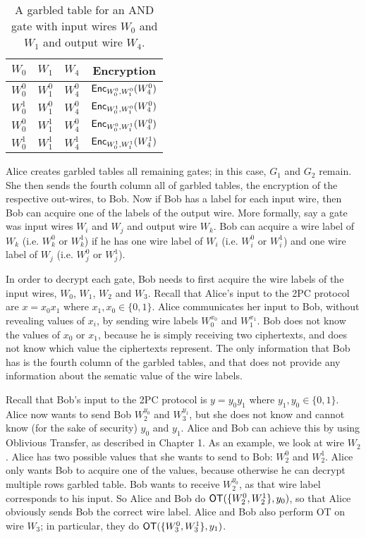 \begin{table}[h]
\centering
\label{tbl:g0-table}
\begin{tabular}{|c|c|c|c|}
\hline
$W_0$ & $W_1$ & $W_4$ & Encryption \\
\hline
$W_0^0$ & $W_1^0$ & $W_4^0$ & $\textsf{Enc}_{W_0^0, W_1^0}(W_4^0)$ \\
$W_0^1$ & $W_1^0$ & $W_4^0$ & $\textsf{Enc}_{W_0^1, W_1^0}(W_4^0)$ \\
$W_0^0$ & $W_1^1$ & $W_4^0$ & $\textsf{Enc}_{W_0^0, W_1^1}(W_4^0)$ \\
$W_0^1$ & $W_1^1$ & $W_4^1$ & $\textsf{Enc}_{W_0^1, W_1^1}(W_4^1)$ \\
\hline
\end{tabular}
\caption{A garbled table for an AND gate with input wires $W_0$ and $W_1$ and output wire $W_4$.}
\end{table}

Alice creates garbled tables all remaining gates; in this case, $G_1$ and $G_2$ remain.
She then sends the fourth column all of garbled tables, the encryption of the respective out-wires, to Bob.
Now if Bob has a label for each input wire, then Bob can acquire one of the labels of the output wire.
More formally, say a gate was input wires $W_i$ and $W_j$ and output wire $W_k$.
Bob can acquire a wire label of $W_k$ (i.e. $W_k^0$ or $W_k^1$) if he has one wire label of $W_i$ (i.e. $W_i^0$ or $W_i^1$) and one wire label of $W_j$ (i.e. $W_j^0$ or $W_j^1$).

In order to decrypt each gate, Bob needs to first acquire the wire labels of the input wires, $W_0$, $W_1$, $W_2$ and $W_3$.
Recall that Alice's input to the 2PC protocol are $x = x_0x_1$ where $x_1, x_0 \in \{0,1\}$.
Alice communicates her input to Bob, without revealing values of $x_i$, by sending wire labels $W_0^{x_0}$ and $W_1^{x_1}$.
Bob does not know the values of $x_0$ or $x_1$, because he is simply receiving two ciphertexts, and does not know which value the ciphertexts represent.
The only information that Bob has is the fourth column of the garbled tables, and that does not provide any information about the sematic value of the wire labels.

Recall that Bob's input to the 2PC protocol is $y = y_0 y_1$ where $y_1, y_0 \in \{0,1\}$.
Alice now wants to send Bob $W_2^{y_0}$ and $W_3^{y_1}$, but she does not know and cannot know (for the sake of security) $y_0$ and $y_1$.
Alice and Bob can achieve this by using Oblivious Transfer, as described in Chapter 1.
As an example, we look at wire $W_2$.
Alice has two possible values that she wants to send to Bob: $W_2^0$ and $W_2^1$.
Alice only wants Bob to acquire one of the values, because otherwise he can decrypt multiple rows garbled table.
Bob wants to receive $W_2^{y_0}$, as that wire label corresponds to his input.
So Alice and Bob do $\textsf{OT}(\{W_2^0, W_2^1\}, y_0)$, so that Alice obviously sends Bob the correct wire label.
Alice and Bob also perform OT on wire $W_3$; in particular, they do $\textsf{OT}(\{W_3^0, W_3^1\}, y_1)$.

